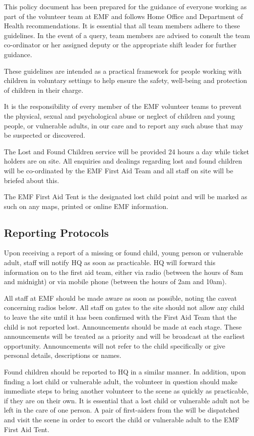 This policy document has been prepared for the guidance of everyone working as
part of the volunteer team at EMF and follows Home Office and Department of
Health recommendations. It is essential that all team members adhere to these
guidelines. In the event of a query, team members are advised to consult the
team co-ordinator or her assigned deputy or the appropriate shift leader for
further guidance.

These guidelines are intended as a practical framework for people working with
children in voluntary settings to help ensure the safety, well-being and
protection of children in their charge.

It is the responsibility of every member of the EMF volunteer teams to prevent
the physical, sexual and psychological abuse or neglect of children and young
people, or vulnerable adults, in our care and to report any such abuse that may
be suspected or discovered.

The Lost and Found Children service will be provided 24 hours a day while
ticket holders are on site. All enquiries and dealings regarding lost and found
children will be co-ordinated by the EMF First Aid Team and all staff on site
will be briefed about this.

The EMF First Aid Tent is the designated lost child point and will be marked as
such on any maps, printed or online EMF information.

\subsection{Reporting Protocols}

Upon receiving a report of a missing or found child, young person or vulnerable
adult, staff will notify HQ as soon as practicable. HQ will forward this
information on to the first aid team, either via radio (between the hours of
8am and midnight) or via mobile phone (between the hours of 2am and 10am).

All staff at EMF should be made aware as soon as possible, noting the
caveat concerning radios below. All staff on gates to the site should not allow
any child to leave the site until it has been confirmed with the First Aid Team
that the child is not reported lost. Announcements should be made at each
stage. These announcements will be treated as a priority and will be broadcast
at the earliest opportunity. Announcements will not refer to the child
specifically or give personal details, descriptions or names.

Found children should be reported to HQ in a similar manner. In addition, upon
finding a lost child or vulnerable adult, the volunteer in question should make
immediate steps to bring another volunteer to the scene as quickly as
practicable, if they are on their own. It is essential that a lost child or
vulnerable adult not be left in the care of one person. A pair of first-aiders
from the will be dispatched and visit the scene in order to escort the child or
vulnerable adult to the EMF First Aid Tent.

